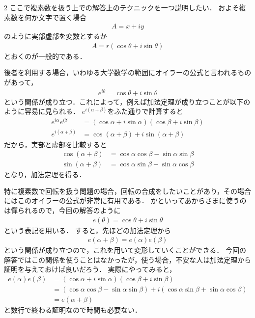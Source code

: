 \documentclass[../../main.tex]{subfiles}
\begin{document}
\begin{multicols}{2}
  ここで複素数を扱う上での解答上のテクニックを一つ説明したい．
  およそ複素数を何か文字で置く場合
  \begin{align}
    A = x +iy
  \end{align}
  のように実部虚部を変数とするか
  \begin{align}
    A = r(\cos\theta + i\sin\theta)
  \end{align}
  とおくのが一般的である．

  後者を利用する場合，いわゆる大学数学の範囲にオイラーの公式と言われるものがあって，
  \begin{align}
    e^{i\theta} = \cos\theta + i\sin\theta
  \end{align}
  という関係が成り立つ．これによって，例えば加法定理が成り立つことが以下のように容易に見られる．
  $e^{i(\alpha+\beta)}$をふた通りで計算すると
  \begin{align}
    e^{i\alpha}e^{i\beta} & = \left(\cos\alpha+i\sin\alpha\right)\left(\cos\beta+i\sin\beta\right) \\
    e^{i(\alpha+\beta)}   & = \cos\left(\alpha+\beta\right) + i\sin\left(\alpha+\beta\right)
  \end{align}
  だから，実部と虚部を比較すると
  \begin{align}
    \cos\left(\alpha+\beta\right) & =\cos\alpha\cos\beta - \sin\alpha\sin\beta \\
    \sin\left(\alpha+\beta\right) & =\cos\alpha\sin\beta + \sin\alpha\cos\beta
  \end{align}
  となり，加法定理を得る．

  特に複素数で回転を扱う問題の場合，回転の合成をしたいことがあり，その場合にはこのオイラーの公式が非常に有用である．
  かといってあからさまに使うのは憚られるので，今回の解答のように
  \begin{align}
    e(\theta) = \cos\theta + i\sin\theta
  \end{align}
  という表記を用いる．
  すると，先ほどの加法定理から
  \begin{align}
    e(\alpha+\beta) = e(\alpha)e(\beta)
  \end{align}
  という関係が成り立つので，これを用いて変形していくことができる．
  今回の解答ではこの関係を使うことはなかったが，使う場合，不安な人は加法定理から証明を与えておけば良いだろう．
  実際にやってみると，
  \begin{align}
    e(\alpha)e(\beta)
    & = \left(\cos\alpha+i\sin\alpha\right)\left(\cos\beta+i\sin\beta\right) \\
    & = \left(\cos\alpha\cos\beta - \sin\alpha\sin\beta\right) + i\left(\cos\alpha\sin\beta + \sin\alpha\cos\beta\right) \\
    & = e(\alpha+\beta)
  \end{align}
  と数行で終わる証明なので時間も必要ない．

  \newpage
\end{multicols}
\end{document}
